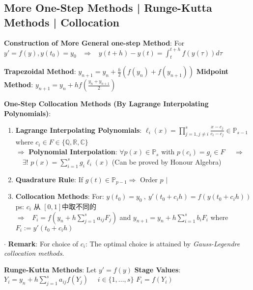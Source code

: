 \documentclass[9pt]{article}
\begin{document}
\subsection{More One-Step Methods | Runge-Kutta Methods | Collocation} %

\textbf{Construction of More General one-step Method}: For $y'=f(y),y(t_0)=y_0$ \ $\Rightarrow$ \ $y(t+h)-y(t)=\int^{t+h}_tf(y(\tau))d\tau$

\textbf{Trapezoidal Method}: $y_{n+1}=y_n+\frac{h}{2}(f(y_n)+f(y_{n+1}))$ \quad \quad \textbf{Midpoint Method}: {\small $y_{n+1}=y_n+hf(\frac{y_n+y_{n+1}}{2})$}

\textbf{One-Step Collocation Methods (By Lagrange Interpolating Polynomials)}:

\begin{enumerate}[itemsep=-2pt, topsep=-2pt]
    \item \textbf{Lagrange Interpolating Polynomials}: $\ell_{i}(x)=\prod_{j=1,j\ne i}^{s}\frac{x-c_j}{c_i-c_j}\in\mathbb{P}_{s-1}$ \quad where $c_i\in F\in\{\mathbb{Q},\mathbb{R},\mathbb{C}\}$ \\
    $\Rightarrow$ \textbf{Polynomial Interpolation}: $\forall p(x)\in \mathbb{P}_s$ with $p(c_i)=g_i\in F$ \ \ $\Rightarrow$ \ \ $\exists!$ $p(x)=\sum_{i=1}^{s}g_i\ell_i(x)$ {\tiny (Can be proved by Honour Algebra)}
    \item \textbf{Quadrature Rule}: {\scriptsize If $g(t)\in\mathbb{P}_{p-1}\Rightarrow$ Order $p$} \quad $\big|$  
    \item \textbf{Collocation Methods}: For: $y(t_0)=y_0 \ , \ y'(t_0+c_ih)=f(y(t_0+c_ih))$ {\tiny ps: $c_i$ 从 $[0,1]$中取不同的} \\
    $\Rightarrow$ \ $F_i=f(y_n+h\sum_{j=1}^{s}a_{ij}F_j)$ and $y_{n+1}=y_n+h\sum_{i=1}^{s}b_iF_i$ \hspace{30pt} where $F_i:=y'(t_0+c_ih)$
\end{enumerate}

$\cdot$ \textbf{Remark}: {\footnotesize For choice of $c_i$: The optimal choice is attained by \textit{Gauss-Legendre collocation methods}}.

\textbf{Runge-Kutta Methods}: {\small Let $y'=f(y)$ \quad \textbf{Stage Values}: $Y_i=y_n+h\sum_{j=1}^{s}a_{ij}f(Y_{j})$ \ \ $i\in\{1,...,s\}$ \quad $F_i=f(Y_i)$ \quad {}}
\end{document}
